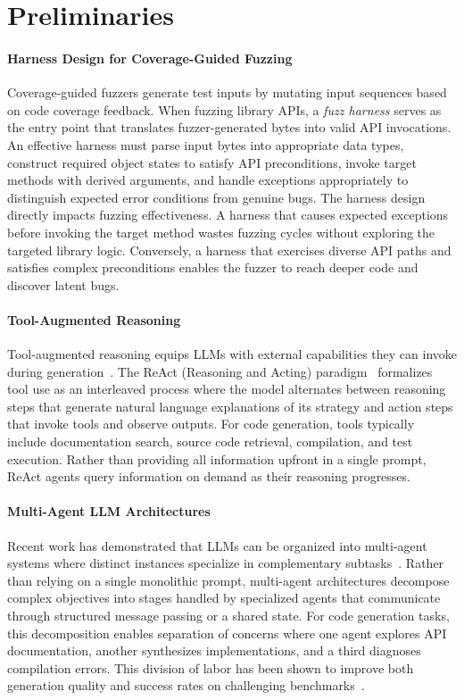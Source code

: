 
\section{Preliminaries}

\paragraph{Harness Design for Coverage-Guided Fuzzing}
Coverage-guided fuzzers generate test inputs by mutating input sequences based on code coverage feedback. When fuzzing library APIs, a \emph{fuzz harness} serves as the entry point that translates fuzzer-generated bytes into valid API invocations. An effective harness must parse input bytes into appropriate data types, construct required object states to satisfy API preconditions, invoke target methods with derived arguments, and handle exceptions appropriately to distinguish expected error conditions from genuine bugs. The harness design directly impacts fuzzing effectiveness. A harness that causes expected exceptions before invoking the target method wastes fuzzing cycles without exploring the targeted library logic. Conversely, a harness that exercises diverse API paths and satisfies complex preconditions enables the fuzzer to reach deeper code and discover latent bugs.

\paragraph{Tool-Augmented Reasoning}
Tool-augmented reasoning equips LLMs with external capabilities they can invoke during generation~\cite{DBLP:conf/nips/SchickDSHWSCSW23:Toolformer,CITE:ToolLLM}. The ReAct (Reasoning and Acting) paradigm~\cite{DBLP:conf/iclr:YaoZYDN023:ReAct} formalizes tool use as an interleaved process where the model alternates between reasoning steps that generate natural language explanations of its strategy and action steps that invoke tools and observe outputs. For code generation, tools typically include documentation search, source code retrieval, compilation, and test execution. Rather than providing all information upfront in a single prompt, ReAct agents query information on demand as their reasoning progresses.

\paragraph{Multi-Agent LLM Architectures}
Recent work has demonstrated that LLMs can be organized into multi-agent systems where distinct instances specialize in complementary subtasks~\cite{CITE:MultiAgentCode}. Rather than relying on a single monolithic prompt, multi-agent architectures decompose complex objectives into stages handled by specialized agents that communicate through structured message passing or a shared state. For code generation tasks, this decomposition enables separation of concerns where one agent explores API documentation, another synthesizes implementations, and a third diagnoses compilation errors. This division of labor has been shown to improve both generation quality and success rates on challenging benchmarks~\cite{CITE:AgentBench}.

